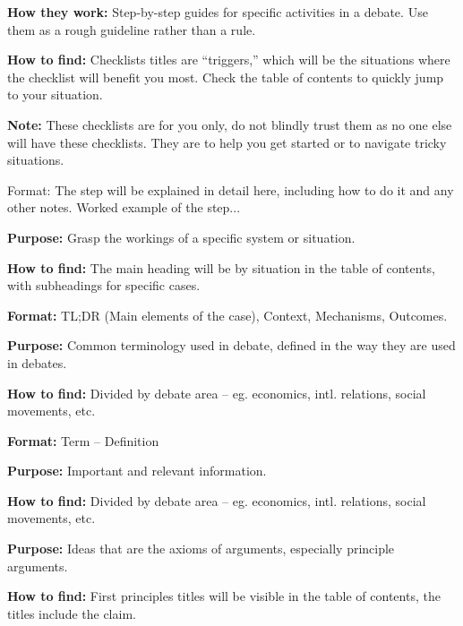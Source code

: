 
\textbf{How they work:} Step-by-step guides for specific activities in a debate. Use them as a rough guideline rather than a rule.

\textbf{How to find:} Checklists titles are “triggers,” which will be the situations where the checklist will benefit you most. Check the table of contents to quickly jump to your situation.

\textbf{Note:} These checklists are for you only, do not blindly trust them as no one else will have these checklists. They are to help you get started or to navigate tricky situations.

\begin{checklist}{Format:}
           {The step will be explained in detail here, including how to do it and any other notes.}
           {Worked example of the step...}
\end{checklist}

\textbf{Purpose:} Grasp the workings of a specific system or situation.

\textbf{How to find:} The main heading will be by situation in the table of contents, with subheadings for specific cases.

\textbf{Format:} TL;DR (Main elements of the case), Context, Mechanisms, Outcomes. 


\textbf{Purpose:} Common terminology used in debate, defined in the way they are used in debates.

\textbf{How to find:} Divided by debate area – eg. economics, intl. relations, social movements, etc.

\textbf{Format:} Term – Definition


\textbf{Purpose:} Important and relevant information.

\textbf{How to find:} Divided by debate area – eg. economics, intl. relations, social movements, etc.


\textbf{Purpose:} Ideas that are the axioms of arguments, especially principle arguments.

\textbf{How to find:} First principles titles will be visible in the table of contents, the titles include the claim.

